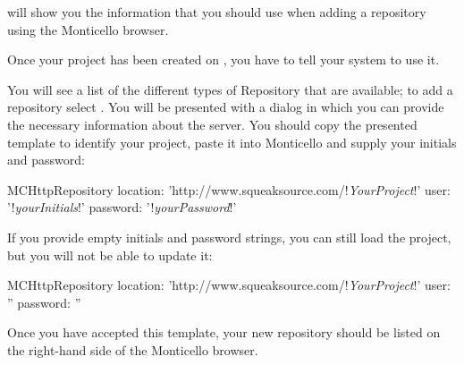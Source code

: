 \documentclass[a4paper,10pt,twoside]{book}
\begin{document}
\sqsrc will show you the information that you should use when adding a repository using the Monticello browser. 

Once your project has been created on \sqsrc, you have to tell your \pharo system to use it. 

  You will see a list of the different types of Repository that are available; to add a \sqsrc repository select . You will be presented with a dialog in which you can provide the necessary information about the server.
You should copy the presented template to identify your \sqsrc project, paste it into Monticello and supply your initials and password:

\begin{code}{}
MCHttpRepository 
    location: 'http://www.squeaksource.com/!\emph{YourProject}!'
    user: '!\emph{yourInitials}!' 
    password: '!\emph{yourPassword}!'
\end{code}   

\noindent
If you provide empty initials and password strings, you can still load the project, but you will not be able to update it:

\begin{code}{}
MCHttpRepository 
    location: 'http://www.squeaksource.com/!\emph{YourProject}!'
    user: '' 
    password: ''
\end{code}   

Once you have accepted this template, your new repository should be listed on the right-hand side of the Monticello browser.
\end{document}
